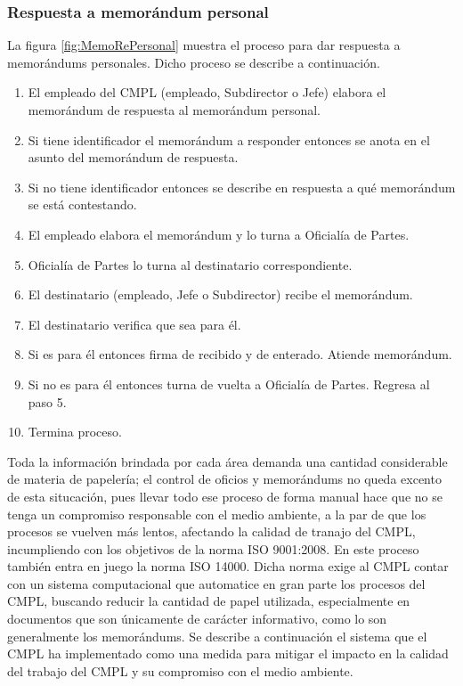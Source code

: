 	\subsubsection{Respuesta a memorándum personal}
	La figura \ref{fig:MemoRePersonal} muestra el proceso para dar respuesta a memorándums personales. Dicho proceso se describe a continuación.
	
	\begin{enumerate}
		\item El empleado del CMPL (empleado, Subdirector o Jefe) elabora el memorándum de respuesta al memorándum personal.
		\item Si tiene identificador el memorándum a responder entonces se anota en el asunto del memorándum de respuesta.
		\item Si no tiene identificador entonces se describe en respuesta a qué memorándum se está contestando.
		\item El empleado elabora el memorándum y lo turna a Oficialía de Partes.
		\item Oficialía de Partes lo turna al destinatario correspondiente.
		\item El destinatario (empleado, Jefe o Subdirector) recibe el memorándum.
		\item El destinatario verifica que sea para él.
		\item Si es para él entonces firma de recibido y de enterado. Atiende memorándum.
		\item Si no es para él entonces turna de vuelta a Oficialía de Partes. Regresa al paso 5.
		\item Termina proceso.
	\end{enumerate}
	
	Toda la información brindada por cada área demanda una cantidad considerable de materia de papelería; el control de oficios y memorándums no queda excento de esta situcación, pues llevar todo ese proceso de forma manual hace que no se tenga un compromiso responsable con el medio ambiente, a la par de que los procesos se vuelven más lentos, afectando la calidad de tranajo del CMPL, incumpliendo con los objetivos de la norma ISO 9001:2008.  En este proceso también entra en juego la norma ISO 14000. Dicha norma exige al CMPL contar con un sistema computacional que automatice en gran parte los procesos del CMPL, buscando reducir la cantidad de papel utilizada, especialmente en documentos que son únicamente de carácter informativo, como lo son generalmente los memorándums. Se describe a continuación el sistema que el CMPL ha implementado como una medida para mitigar el impacto en la calidad del trabajo del CMPL y su compromiso con el medio ambiente.\\
	
